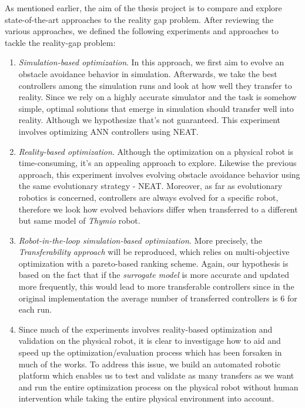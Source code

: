 As mentioned earlier, the aim of the thesis project is to compare and explore state-of-the-art approaches to the reality gap problem. After reviewing the various approaches, we defined the following experiments and approaches to tackle the reality-gap problem:

\begin{enumerate}
    \item{\emph{Simulation-based optimization}. In this approach, we first aim to evolve an obstacle avoidance behavior in simulation. Afterwards, we take the best controllers among the simulation runs and look at how well they transfer to reality. Since we rely on a highly accurate simulator and the task is somehow simple, optimal solutions that emerge in simulation should transfer well into reality. Although we hypothesize that's not guaranteed. This experiment involves optimizing ANN controllers using NEAT.}
    
    \item{\emph{Reality-based optimization}. Although the optimization on a physical robot is time-consuming, it's an appealing approach to explore. Likewise the previous approach, this experiment involves evolving obstacle avoidance behavior using the same evolutionary strategy - NEAT. Moreover, as far as evolutionary robotics is concerned, controllers are always evolved for a specific robot, therefore we look how evolved behaviors differ when transferred to a different but same model of \emph{Thymio} robot.}
    
    \item{\emph{Robot-in-the-loop simulation-based optimization}. More precisely, the \emph{Transferability approach} will be reproduced, which relies on multi-objective optimization with a pareto-based ranking scheme. Again, our  hypothesis is based on the fact that if the \textit{surrogate model} is more accurate and updated more frequently, this would lead to more transferable controllers since in the original implementation the average number of transferred controllers is 6 for each run.}
    
    \item{Since much of the experiments involves reality-based optimization and validation on the physical robot, it is clear to investigage how to aid and speed up the optimization/evaluation process which has been forsaken in much of the works. To address this issue, we build an automated robotic platform which enables us to test and validate as many transfers as we want and run the entire optimization process on the physical robot without human intervention while taking the entire physical environment into account.}
\end{enumerate}




